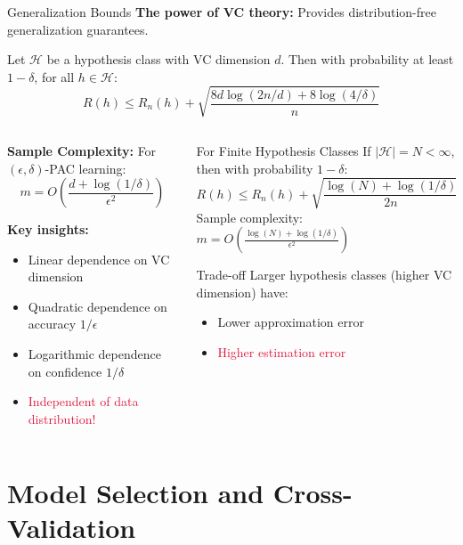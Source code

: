 \documentclass[aspectratio=169,11pt]{beamer}
\begin{document}
\begin{frame}{Generalization Bounds}
\textbf{The power of VC theory:} Provides distribution-free generalization guarantees.

\begin{theorem}
Let $\mathcal{H}$ be a hypothesis class with VC dimension $d$. Then with probability at least $1-\delta$, for all $h \in \mathcal{H}$:
\[R(h) \leq R_n(h) + \sqrt{\frac{8d\log(2n/d) + 8\log(4/\delta)}{n}}\]
\end{theorem}

\begin{columns}
\begin{column}{0.5\textwidth}
\textbf{Sample Complexity:}
For $(\epsilon, \delta)$-PAC learning:
\[m = O\left(\frac{d + \log(1/\delta)}{\epsilon^2}\right)\]

\textbf{Key insights:}
\begin{itemize}
\item Linear dependence on VC dimension
\item Quadratic dependence on accuracy $1/\epsilon$
\item Logarithmic dependence on confidence $1/\delta$
\item \textcolor{crimson}{Independent of data distribution!}
\end{itemize}
\end{column}
\begin{column}{0.5\textwidth}
\begin{block}{For Finite Hypothesis Classes}
If $|\mathcal{H}| = N < \infty$, then with probability $1-\delta$:
\[R(h) \leq R_n(h) + \sqrt{\frac{\log(N) + \log(1/\delta)}{2n}}\]
Sample complexity: $m = O\left(\frac{\log(N) + \log(1/\delta)}{\epsilon^2}\right)$
\end{block}

\begin{alertblock}{Trade-off}
Larger hypothesis classes (higher VC dimension) have:
\begin{itemize}
\item \textcolor{forest}{Lower approximation error}
\item \textcolor{crimson}{Higher estimation error}
\end{itemize}
\end{alertblock}
\end{column}
\end{columns}
\end{frame}

\section{Model Selection and Cross-Validation}
\end{document}
